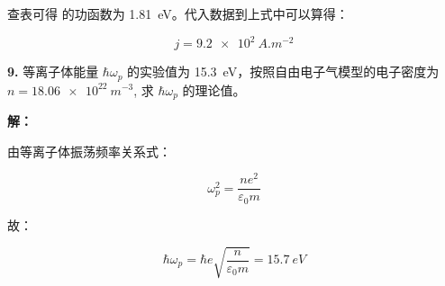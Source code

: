 查表可得  的功函数为 \qty{1.81}{eV}。代入数据到上式中可以算得：

\begin{equation*}
    j = \qty{9.2e2}{A.m^{-2}}
\end{equation*}

\noindent \textbf{9.\quad}  等离子体能量 $\hbar \omega_p$ 的实验值为 \qty{15.3}{eV}，按照自由电子气模型的电子密度为 $n=\qty{18.06e22}{m^{-3}}$, 求 $\hbar \omega_p$ 的理论值。

\noindent \textbf{解：}

由等离子体振荡频率关系式：

\begin{equation*}
    \omega_p^2 = \frac{n e^2}{\varepsilon_0 m}
\end{equation*}

故：

\begin{equation*}
    \hbar \omega_p = \hbar e \sqrt{\frac{n}{\varepsilon_0 m}} = \qty{15.7}{eV}
\end{equation*}

